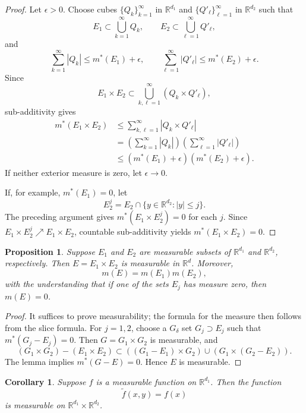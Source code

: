 \documentclass[11pt,openany]{book}
\newtheorem{corollary}[theorem]{Corollary}
\newtheorem{proposition}[theorem]{Proposition}
\begin{document}
\begin{proof}
Let $\epsilon>0$. Choose cubes $\{Q_k\}_{k=1}^{\infty}$ in $\mathbb{R}^{d_1}$ and $\{Q'_\ell\}_{\ell=1}^{\infty}$ in $\mathbb{R}^{d_2}$ such that
\[
E_1\subset\bigcup_{k=1}^{\infty}Q_k,
\qquad
E_2\subset\bigcup_{\ell=1}^{\infty}Q'_\ell,
\]
and
\[
\sum_{k=1}^{\infty}|Q_k|\leq m^*(E_1)+\epsilon,
\qquad
\sum_{\ell=1}^{\infty}|Q'_\ell|\leq m^*(E_2)+\epsilon.
\]
Since
\[
E_1\times E_2\subset\bigcup_{k,\ell=1}^{\infty}(Q_k\times Q'_\ell),
\]
sub-additivity gives
\begin{align*}
m^*(E_1\times E_2)
&\leq\sum_{k,\ell=1}^{\infty}|Q_k\times Q'_\ell|\\
&=\left(\sum_{k=1}^{\infty}|Q_k|\right)
  \left(\sum_{\ell=1}^{\infty}|Q'_\ell|\right)\\
&\leq(m^*(E_1)+\epsilon)(m^*(E_2)+\epsilon).
\end{align*}
If neither exterior measure is zero, let $\epsilon\to0$.

If, for example, $m^*(E_1)=0$, let
\[
E_2^j=E_2\cap\{y\in\mathbb{R}^{d_2}:|y|\leq j\}.
\]
The preceding argument gives $m^*(E_1\times E_2^j)=0$ for each $j$. Since $E_1\times E_2^j\nearrow E_1\times E_2$, countable sub-additivity yields $m^*(E_1\times E_2)=0$.
\end{proof}

\begin{proposition}
Suppose $E_1$ and $E_2$ are measurable subsets of $\mathbb{R}^{d_1}$ and $\mathbb{R}^{d_2}$, respectively. Then $E=E_1\times E_2$ is measurable in $\mathbb{R}^d$. Moreover,
\[
m(E)=m(E_1)m(E_2),
\]
with the understanding that if one of the sets $E_j$ has measure zero, then $m(E)=0$.
\end{proposition}

\begin{proof}
It suffices to prove measurability; the formula for the measure then follows from the slice formula. For $j=1,2$, choose a $G_\delta$ set $G_j\supset E_j$ such that $m^*(G_j-E_j)=0$. Then $G=G_1\times G_2$ is measurable, and
\[
(G_1\times G_2)-(E_1\times E_2)
\subset
((G_1-E_1)\times G_2)\cup(G_1\times(G_2-E_2)).
\]
The lemma implies $m^*(G-E)=0$. Hence $E$ is measurable.
\end{proof}

\begin{corollary}
Suppose $f$ is a measurable function on $\mathbb{R}^{d_1}$. Then the function
\[
\widetilde f(x,y)=f(x)
\]
is measurable on $\mathbb{R}^{d_1}\times\mathbb{R}^{d_2}$.
\end{corollary}
\end{document}
